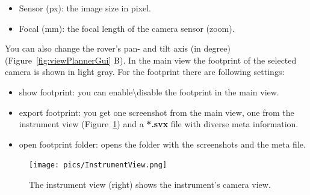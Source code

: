 \begin{itemize}
	\item Sensor (px): the image size in pixel.
	\item Focal (mm): the focal length of the camera sensor (zoom).
\end{itemize}
You can also change the rover's pan- and tilt axis (in degree) (Figure~\ref{fig:viewPlannerGui} B).
In the main view the footprint of the selected camera is shown in light gray. For the footprint there are following settings:
\begin{itemize}
	\item show footprint: you can enable\textbackslash disable the footprint in the main view.
	\item export footprint: you get one screenshot from the main view, one from the instrument view (Figure~\ref{fig:instView}) and a \textbf{*.svx} file with diverse meta information.
	\item open footprint folder: opens the folder with the screenshots and the meta file.
\end{itemize}
\begin{figure}[h]
    	\centering
    		\texttt{[image: pics/InstrumentView.png]}
    	\caption[Instrument View]{The instrument view (right) shows the instrument's camera view.}
    	\label{fig:instView}
   \end{figure}